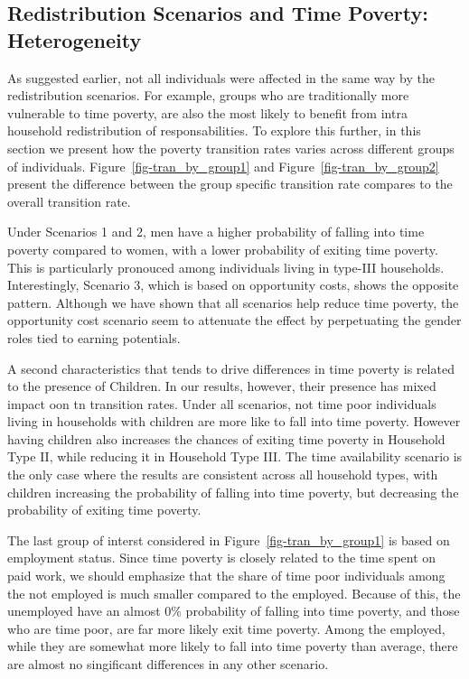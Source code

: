 \documentclass[
  11pt,
]{article}
\begin{document}
\subsection{Redistribution Scenarios and Time Poverty:
Heterogeneity}\label{redistribution-scenarios-and-time-poverty-heterogeneity}

As suggested earlier, not all individuals were affected in the same way
by the redistribution scenarios. For example, groups who are
traditionally more vulnerable to time poverty, are also the most likely
to benefit from intra household redistribution of responsabilities. To
explore this further, in this section we present how the poverty
transition rates varies across different groups of individuals.
Figure~\ref{fig-tran_by_group1} and Figure~\ref{fig-tran_by_group2}
present the difference between the group specific transition rate
compares to the overall transition rate.

Under Scenarios 1 and 2, men have a higher probability of falling into
time poverty compared to women, with a lower probability of exiting time
poverty. This is particularly pronouced among individuals living in
type-III households. Interestingly, Scenario 3, which is based on
opportunity costs, shows the opposite pattern. Although we have shown
that all scenarios help reduce time poverty, the opportunity cost
scenario seem to attenuate the effect by perpetuating the gender roles
tied to earning potentials.

A second characteristics that tends to drive differences in time poverty
is related to the presence of Children. In our results, however, their
presence has mixed impact oon tn transition rates. Under all scenarios,
not time poor individuals living in households with children are more
like to fall into time poverty. However having children also increases
the chances of exiting time poverty in Household Type II, while reducing
it in Household Type III. The time availability scenario is the only
case where the results are consistent across all household types, with
children increasing the probability of falling into time poverty, but
decreasing the probability of exiting time poverty.

The last group of interst considered in Figure~\ref{fig-tran_by_group1}
is based on employment status. Since time poverty is closely related to
the time spent on paid work, we should emphasize that the share of time
poor individuals among the not employed is much smaller compared to the
employed. Because of this, the unemployed have an almost 0\% probability
of falling into time poverty, and those who are time poor, are far more
likely exit time poverty. Among the employed, while they are somewhat
more likely to fall into time poverty than average, there are almost no
singificant differences in any other scenario.
\end{document}
